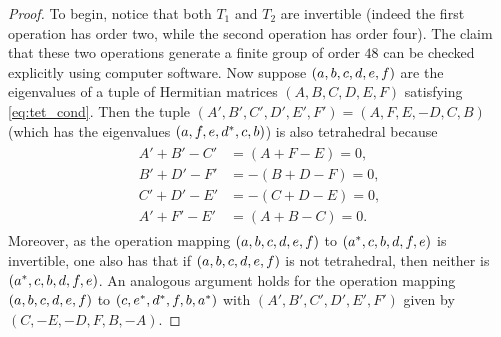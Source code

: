 \documentclass[notitlepage, 11pt, letterpaper]{amsart}
\begin{document}
\begin{prop}[Oriented]
\end{prop}
\begin{proof}
    To begin, notice that both $T_1$ and $T_2$ are invertible (indeed the first operation has order two, while the second operation has order four).
    The claim that these two operations generate a finite group of order $48$ can be checked explicitly using computer software.
    Now suppose $(a,b,c,d,e,f)$ are the eigenvalues of a tuple of Hermitian matrices $(A,B,C,D,E,F)$ satisfying \cref{eq:tet_cond}.
    Then the tuple $(A',B',C',D',E',F') = (A,F,E,-D,C,B)$ (which has the eigenvalues $(a, f, e, d^{*}, c, b)$) is also tetrahedral because
    \begin{align}
        \label{eq:signed_perm_rows}
        \begin{split}
            A'+B'-C' &= (A+F-E) = 0,  \\
            B'+D'-F' &= -(B+D-F) = 0, \\
            C'+D'-E' &= -(C+D-E) = 0, \\
            A'+F'-E' &= (A+B-C) = 0.
        \end{split}
    \end{align}
    Moreover, as the operation mapping $(a,b,c,d,e,f)$ to $(a^*, c, b, d, f, e)$ is invertible, one also has that if $(a,b,c,d,e,f)$ is not tetrahedral, then neither is $(a^*, c, b, d, f, e)$.
    An analogous argument holds for the operation mapping $(a,b,c,d,e,f)$ to $(c, e^*, d^{*}, f, b, a^*)$ with $(A',B',C',D',E',F')$ given by $(C,-E,-D,F,B,-A)$.
\end{proof}
\end{document}

